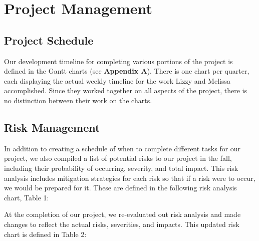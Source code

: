 \chapter{Project Management}

\section{Project Schedule}
Our development timeline for completing various portions of the project is defined in the Gantt charts (see \textbf{Appendix A}). There is one chart per quarter, each displaying the actual weekly timeline for the work Lizzy and Melissa accomplished. Since they worked together on all aspects of the project, there is no distinction between their work on the charts.

\section{Risk Management}
In addition to creating a schedule of when to complete different tasks for our project, we also compiled a list of potential risks to our project in the fall, including their probability of occurring, severity, and total impact. This risk analysis includes mitigation strategies for each risk so that if a risk were to occur, we would be prepared for it. These are defined in the following risk analysis chart, Table 1:

At the completion of our project, we re-evaluated out risk analysis and made changes to reflect the actual risks, severities, and impacts. This updated risk chart is defined in Table 2:
